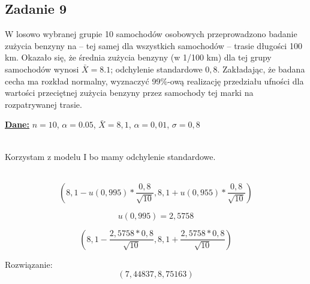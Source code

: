 \subsection{Zadanie 9}
W losowo wybranej grupie 10 samochodów osobowych przeprowadzono badanie zużycia benzyny na -- tej samej dla wszystkich samochodów -- trasie długości 100 km. Okazało się, że średnia zużycia benzyny (w 1/100 km) dla tej grupy samochodów wynosi $\bar X = 8.1$; odchylenie standardowe $0,8$. Zakładając, że badana cecha ma rozkład normalny, wyznaczyć 99\%-ową realizację przedziału ufności dla wartości przeciętnej zużycia benzyny przez samochody tej marki na rozpatrywanej trasie.  

\newline

\textbf{\underline{Dane:}}
$n = 10$, 
$\alpha = 0.05$,
$\bar X = 8,1$,
$ \alpha = 0,01$,
$\sigma = 0,8$
\newline

\\

Korzystam z modelu I bo mamy odchylenie standardowe.

\\

$$ ( 8,1-u(0,995)*\frac{0,8}{\sqrt{10}} , 8,1 + u(0,955)*\frac{0,8}{\sqrt{10}} ) $$

$$ u(0,995) = 2,5758  $$

$$ (8,1 - \frac{2,5758*0,8}{\sqrt{10}}, 8,1 + \frac{2,5758*0,8}{\sqrt{10}}) $$

Rozwiązanie:
\\

$$ (7,44837   ,   8,75163)  $$

